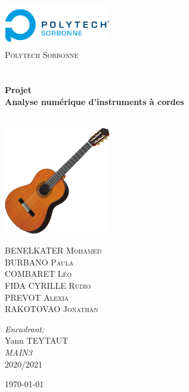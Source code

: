 \begin{titlepage}
\begin{center}

\includegraphics[width=0.35\textwidth]{./Logo_Polytech_Sorbonne}~\\[1cm]

\textsc{\LARGE Polytech Sorbonne}\\[1.5cm]

\textsc{\Large }\\[0.5cm]

\HRule \\[0.4cm]

{\huge \bfseries Projet\\
Analyse numérique d’instruments à cordes \\[0.4cm] }

\HRule \\[1.5cm]

\includegraphics[width=0.35\textwidth]{./guitare}~\\[1cm]

\begin{minipage}{0.4\textwidth}
\begin{flushleft} \large
BENELKATER \textsc{Mohamed}\\
BURBANO \textsc{Paula}\\
COMBARET \textsc{Léo}\\
FIDA CYRILLE \textsc{Rudio}\\
PREVOT \textsc{Alexia}\\
RAKOTOVAO \textsc{Jonathan}
\end{flushleft}
\end{minipage}
\begin{minipage}{0.4\textwidth}
\begin{flushright} \large
\emph{Encadrant:} \\
Yann \textsc{TEYTAUT}\\
\emph{MAIN3} \\
2020/2021
\end{flushright}
\end{minipage}

\vfill

{\large \today}

\end{center}
\end{titlepage}